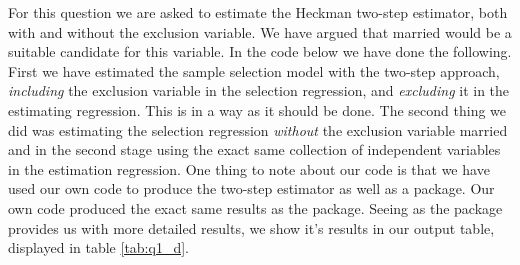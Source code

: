 \documentclass[
]{article}
\begin{document}
For this question we are asked to estimate the Heckman two-step
estimator, both with and without the exclusion variable. We have argued
that married would be a suitable candidate for this variable. In the
code below we have done the following. First we have estimated the
sample selection model with the two-step approach, \emph{including} the
exclusion variable in the selection regression, and \emph{excluding} it
in the estimating regression. This is in a way as it should be done. The
second thing we did was estimating the selection regression
\emph{without} the exclusion variable married and in the second stage
using the exact same collection of independent variables in the
estimation regression. One thing to note about our code is that we have
used our own code to produce the two-step estimator as well as a
package. Our own code produced the exact same results as the package.
Seeing as the package provides us with more detailed results, we show
it's results in our output table, displayed in table \ref{tab:q1_d}.
\end{document}
